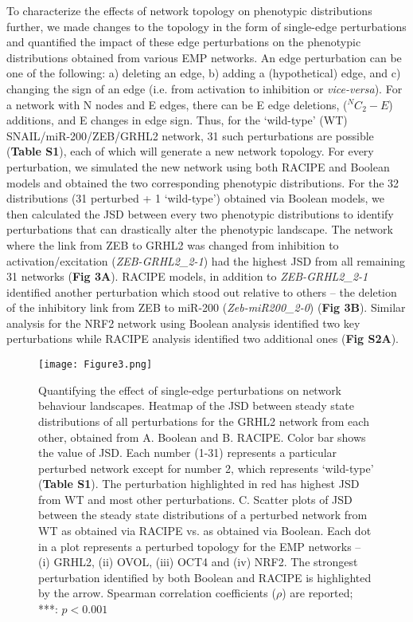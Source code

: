\documentclass[preprint,review,12pt]{elsarticle}
\begin{document}
	To characterize the effects of network topology on phenotypic distributions further, we made changes to the topology in the form of single-edge perturbations and quantified the impact of these edge perturbations on the phenotypic distributions obtained from various EMP networks. An edge perturbation can be one of the following: a) deleting an edge, b) adding a (hypothetical) edge, and c) changing the sign of an edge (i.e. from activation to inhibition or \textit{vice-versa}). For a network with N nodes and E edges, there can be E edge deletions, ($^NC_2 - E$) additions, and E changes in edge sign. Thus, for the ‘wild-type’ (WT) SNAIL/miR-200/ZEB/GRHL2 network, 31 such perturbations are possible (\textbf{Table S1}), each of which will generate a new network topology. For every perturbation, we simulated the new network using both RACIPE and Boolean models and obtained the two corresponding phenotypic distributions. For the 32 distributions (31 perturbed + 1 ‘wild-type’) obtained via Boolean models, we then calculated the JSD between every two phenotypic distributions to identify perturbations that can drastically alter the phenotypic landscape. The network where the link from ZEB to GRHL2 was changed from inhibition to activation/excitation (\textit{ZEB-GRHL2\_2-1}) had the highest JSD from all remaining 31 networks (\textbf{Fig 3A}). RACIPE models, in addition to \textit{ZEB-GRHL2\_2-1} identified another perturbation which stood out relative to others – the deletion of the inhibitory link from ZEB to miR-200 (\textit{Zeb-miR200\_2-0}) (\textbf{Fig 3B}). Similar analysis for the NRF2 network using Boolean analysis identified two key perturbations while RACIPE analysis identified two additional ones (\textbf{Fig S2A}).
	
	
	\begin{figure}[!ht]
		\centering
		\texttt{[image: Figure3.png]}
		\caption{Quantifying the effect of single-edge perturbations on network behaviour landscapes.
			Heatmap of the JSD between steady state distributions  of all perturbations for the GRHL2 network from each other, obtained from A. Boolean and B. RACIPE. Color bar shows the value of JSD. Each number (1-31) represents a particular perturbed network except for number 2, which represents `wild-type' (\textbf{Table S1}). The perturbation highlighted in red has highest JSD from WT and most other perturbations.
			C.	Scatter plots of  JSD between the steady state distributions of a perturbed network from WT as obtained via RACIPE vs. as obtained via Boolean. Each dot in a plot represents a perturbed topology for the EMP networks – (i) GRHL2, (ii) OVOL, (iii) OCT4 and (iv) NRF2. The strongest perturbation identified by both Boolean and RACIPE is highlighted by the arrow. Spearman correlation coefficients ($\rho$) are reported; ***: $p< 0.001$}
		\label{figure3}
	\end{figure}
\end{document}
